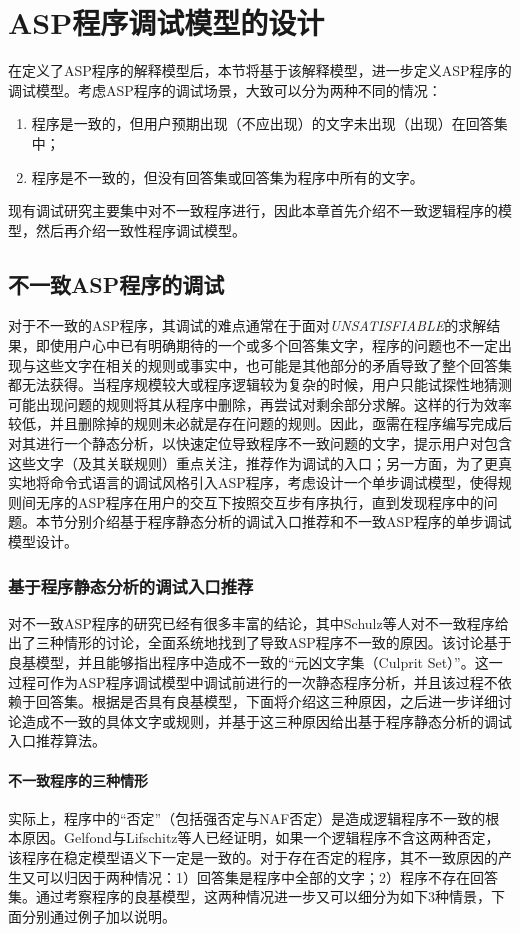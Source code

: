 \chapter{ASP程序调试模型的设计}
\label{chp:debug}
在定义了ASP程序的解释模型后，本节将基于该解释模型，进一步定义ASP程序的调试模型。考虑ASP程序的调试场景，大致可以分为两种不同的情况：
\begin{enumerate}[topsep=0pt]
    \setlength\itemsep{-0.3em}
    \item 程序是一致的，但用户预期出现（不应出现）的文字未出现（出现）在回答集中；
    \item 程序是不一致的，但没有回答集或回答集为程序中所有的文字\cite{schulz2015characterising}。
\end{enumerate}
现有调试研究主要集中对不一致程序进行，因此本章首先介绍不一致逻辑程序的模型，然后再介绍一致性程序调试模型。
\section{不一致ASP程序的调试}
对于不一致的ASP程序，其调试的难点通常在于面对\textit{UNSATISFIABLE}的求解结果，即使用户心中已有明确期待的一个或多个回答集文字，程序的问题也不一定出现与这些文字在相关的规则或事实中，也可能是其他部分的矛盾导致了整个回答集都无法获得。当程序规模较大或程序逻辑较为复杂的时候，用户只能试探性地猜测可能出现问题的规则将其从程序中删除，再尝试对剩余部分求解。这样的行为效率较低，并且删除掉的规则未必就是存在问题的规则。因此，亟需在程序编写完成后对其进行一个静态分析，以快速定位导致程序不一致问题的文字，提示用户对包含这些文字（及其关联规则）重点关注，推荐作为调试的入口；另一方面，为了更真实地将命令式语言的调试风格引入ASP程序，考虑设计一个单步调试模型，使得规则间无序的ASP程序在用户的交互下按照交互步有序执行，直到发现程序中的问题。本节分别介绍基于程序静态分析的调试入口推荐和不一致ASP程序的单步调试模型设计。
\subsection{基于程序静态分析的调试入口推荐}
对不一致ASP程序的研究已经有很多丰富的结论，其中Schulz等人对不一致程序给出了三种情形的讨论\cite{schulz2015characterising}，全面系统地找到了导致ASP程序不一致的原因。该讨论基于良基模型，并且能够指出程序中造成不一致的“元凶文字集（Culprit Set）”。这一过程可作为ASP程序调试模型中调试前进行的一次静态程序分析，并且该过程不依赖于回答集。根据是否具有良基模型，下面将介绍这三种原因，之后进一步详细讨论造成不一致的具体文字或规则，并基于这三种原因给出基于程序静态分析的调试入口推荐算法。
\subsubsection{不一致程序的三种情形}
实际上，程序中的“否定”（包括强否定与NAF否定）是造成逻辑程序不一致的根本原因。Gelfond与Lifschitz等人已经证明，如果一个逻辑程序不含这两种否定，该程序在稳定模型语义下一定是一致的\cite{gel91b}。对于存在否定的程序，其不一致原因的产生又可以归因于两种情况：1）回答集是程序中全部的文字；2）程序不存在回答集。通过考察程序的良基模型，这两种情况进一步又可以细分为如下3种情景，下面分别通过例子加以说明。

